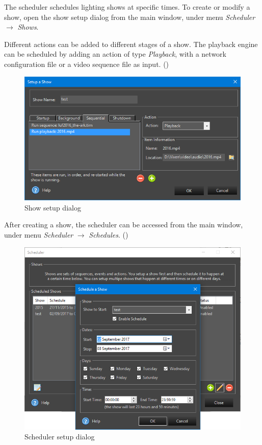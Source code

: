 The scheduler schedules lighting shows at specific times. To create or modify a show, open the show setup dialog from the main window, under menu \textit{Scheduler} $\rightarrow$ \textit{Shows}.

Different actions can be added to different stages of a show. The playback engine can be scheduled by adding an action of type \textit{Playback}, with a network configuration file or a video sequence file as input. ()

\begin{figure}[!htb]
  \centering
  \includegraphics[width=0.8\columnwidth]{Figs/vixen_show.png}
  \caption{\footnotesize Show setup dialog}
  \label{fig:guide_show}
\end{figure}

After creating a show, the scheduler can be accessed from the main window, under menu \textit{Scheduler} $\rightarrow$ \textit{Schedules}. ()

\begin{figure}[!htb]
  \centering
  \includegraphics[width=0.8\columnwidth]{Figs/vixen_scheduler.png}
  \caption{\footnotesize Scheduler setup dialog}
  \label{fig:guide_scheduler}
\end{figure}

